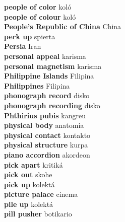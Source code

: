 \textbf{ people of color  } koló \\
\textbf{ people of colour  } koló \\
\textbf{ People’s Republic of China  } China \\
\textbf{ perk up  } spierta \\
\textbf{ Persia  } Iran \\
\textbf{ personal appeal  } karisma \\
\textbf{ personal magnetism  } karisma \\
\textbf{ Philippine Islands  } Filipina \\
\textbf{ Philippines  } Filipina \\
\textbf{ phonograph record  } disko \\
\textbf{ phonograph recording  } disko \\
\textbf{ Phthirius pubis  } kangreu \\
\textbf{ physical body  } anatomia \\
\textbf{ physical contact  } kontakto \\
\textbf{ physical structure  } kurpa \\
\textbf{ piano accordion  } akordeon \\
\textbf{ pick apart  } kritiká \\
\textbf{ pick out  } skohe \\
\textbf{ pick up  } kolektá \\
\textbf{ picture palace  } cinema \\
\textbf{ pile up  } kolektá \\
\textbf{ pill pusher  } botikario \\
